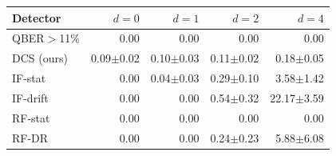 \begin{tabular}{lrrrr}
\hline
Detector & $d=0$ & $d=1$ & $d=2$ & $d=4$\\
\hline
QBER$>$11\% & 0.00 & 0.00 & 0.00 & 0.00\\
DCS (ours) & 0.09$\pm$0.02 & 0.10$\pm$0.03 & 0.11$\pm$0.02 & 0.18$\pm$0.05\\
IF-stat & 0.00 & 0.04$\pm$0.03 & 0.29$\pm$0.10 & 3.58$\pm$1.42\\
IF-drift & 0.00 & 0.00 & 0.54$\pm$0.32 & 22.17$\pm$3.59\\
RF-stat & 0.00 & 0.00 & 0.00 & 0.00\\
RF-DR & 0.00 & 0.00 & 0.24$\pm$0.23 & 5.88$\pm$6.08\\
\hline
\end{tabular}